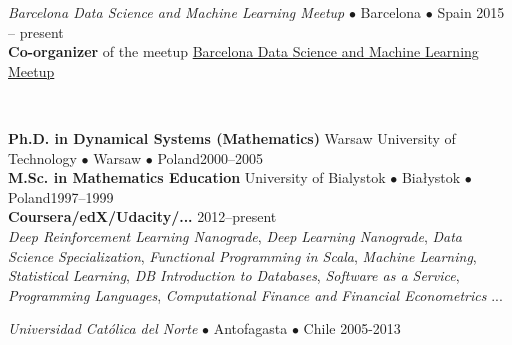 \documentclass[a4paper, oneside]{scrreprt}
\begin{document}
\vspace{-0.3cm}

\noindent{}\textit{Barcelona Data Science and Machine Learning Meetup}
$\bullet$ Barcelona $\bullet$ Spain \hfill 2015 -- present\\
\noindent  \textbf{Co-organizer} of the meetup
  \href{https://www.meetup.com/es-ES/barcelona-data-science-machine-learning/}
  {Barcelona Data Science and Machine Learning Meetup}

\vspace{-0.1cm}
\noindent\makebox[\linewidth]{\rule{\textwidth}{0.4pt}}


\newpage

\ \\

\vspace{1.8cm}

\noindent\makebox[\linewidth]{\rule{\textwidth}{0.4pt}}


\vspace{0.2cm}

\noindent\textbf{Ph.D. in Dynamical Systems (Mathematics)} Warsaw University of Technology $\bullet$ Warsaw $\bullet$ Poland\hfill 2000--2005\\
\noindent\textbf{M.Sc. in Mathematics Education} University of Bialystok $\bullet$ Białystok $\bullet$ Poland\hfill 1997--1999\\
\noindent\textbf{Coursera/edX/Udacity/...} \hfill 2012--present\\
\emph{Deep Reinforcement Learning Nanograde}, 
\emph{Deep Learning Nanograde}, \emph{Data Science Specialization}, \emph{Functional Programming in Scala}, 
\emph{Machine Learning},  \emph{Statistical Learning}, 
\emph{DB Introduction to Databases}, \emph{Software as a Service}, 
\emph{Programming Languages}, 
\emph{Computational Finance and Financial Econometrics} ... \\
\noindent\makebox[\linewidth]{\rule{\textwidth}{0.4pt}}

\vspace{0.2cm}





\noindent{}\textit{Universidad Católica del Norte} $\bullet$ 
Antofagasta $\bullet$ Chile \hfill 2005-2013\\
\\
\end{document}
